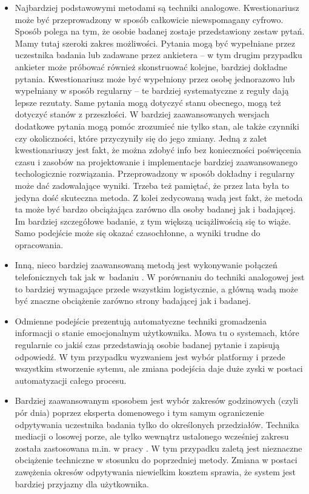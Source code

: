 \begin{itemize}	
	\item Najbardziej podstawowymi metodami są techniki analogowe. Kwestionariusz może być przeprowadzony w sposób całkowicie niewspomagany cyfrowo. Sposób polega na tym, że osobie badanej zostaje przedstawiony zestaw pytań. Mamy tutaj szeroki zakres możliwości. Pytania mogą być wypełniane przez uczestnika badania lub zadawane przez ankietera -- w tym drugim przypadku ankieter może próbować również skonstruować kolejne, bardziej dokładne pytania. Kwestionariusz może być wypełniony przez osobę jednorazowo lub wypełniany w sposób regularny -- te bardziej systematyczne z reguły dają lepsze rezutaty. Same pytania mogą dotyczyć stanu obecnego, mogą też dotyczyć stanów z przeszłości. W bardziej zaawansowanych wersjach dodatkowe pytania mogą pomóc zrozumieć nie tylko stan, ale także czynniki czy okoliczności, które przyczyniły się do jego zmiany. Jedną z zalet kwestionariuszy jest fakt, że można zdobyć info bez konieczności poświęcenia czasu i zasobów na projektowanie i implementacje bardziej zaawansowanego techologicznie rozwiązania. Przeprowadzony w sposób dokładny i regularny może dać zadowalające wyniki. Trzeba też pamiętać, że przez lata była to jedyna dość skuteczna metoda. Z kolei zedycowaną wadą jest fakt, że metoda ta może być bardzo obciążająca zarówno dla osoby badanej jak i badającej. Im bardziej szczegółowe badanie, z tym większą uciążliwością się to wiąże. Samo podejście może się okazać czasochłonne, a wyniki trudne do opracowania.
	
	\item Inną, nieco bardziej zaawansowaną metodą jest wykonywanie połączeń telefonicznych tak jak w~badaniu \cite{courvoisier2010psychometric}. W porównaniu do techniki analogowej jest to bardziej wymagające przede wszystkim logistycznie, a główną wadą może być znaczne obciążenie zarówno strony badającej jak i badanej.
	
	\item Odmienne podejście prezentują automatyczne techniki gromadzenia informacji o stanie emocjonalnym użytkownika. Mowa tu o systemach, które regularnie co jakiś czas przedstawiają osobie badanej pytanie i zapisują odpowiedź. W tym przypadku wyzwaniem jest wybór platformy i przede wszystkim stworzenie sytemu, ale zmiana podejścia daje duże zyski w postaci automatyzacji całego procesu.
	
	\item Bardziej zaawansowanym sposobem jest wybór zakresów godzinowych (czyli pór dnia) poprzez eksperta domenowego i tym samym ograniczenie odpytywania uczestnika badania tylko do określonych przedziałów. Technika mediacji o losowej porze, ale tylko wewnątrz ustalonego wcześniej zakresu została zastosowana m.in. w pracy \cite{bailon2019smartphone}. W tym przypadku zaletą jest nieznaczne obciążenie techniczne w stosunku do poprzedniej metody. Zmiana w postaci zawężenia okresów odpytywania niewielkim kosztem sprawia, że system jest bardziej przyjazny dla użytkownika.
	

\end{itemize}

